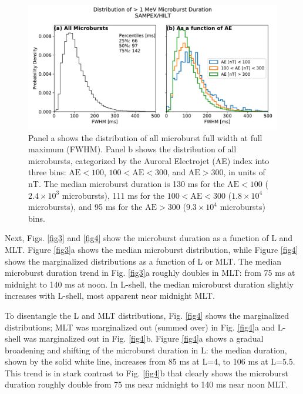 \documentclass[draft]{agujournal2019}
\begin{document}
\begin{figure}
\noindent\includegraphics[width=\textwidth]{figures/fig2.pdf}
\caption{Panel a shows the distribution of all microburst full width at full maximum (FWHM). Panel b shows the distribution of all microbursts, categorized by the Auroral Electrojet (AE) index into three bins: $\mathrm{AE} < 100$, $100 < \mathrm{AE} < 300$, and $\mathrm{AE} > 300$, in units of nT. The median microburst duration is 130 ms for the $\mathrm{AE} < 100$ ($2.4\times 10^{3}$ microbursts), 111 ms for the $100 < \mathrm{AE} < 300$ ($1.8\times 10^{4}$ microbursts), and 95 ms for the $ \mathrm{AE} > 300$ ($9.3\times 10^{4}$ microbursts) bins.}
\label{fig2}
\end{figure}

Next, Figs. \ref{fig3} and \ref{fig4} show the microburst duration as a function of L and MLT. Figure \ref{fig3}a shows the median microburst distribution, while Figure \ref{fig4} shows the marginalized distributions as a function of L or MLT. The median microburst duration trend in Fig. \ref{fig3}a roughly doubles in MLT: from 75 ms at midnight to 140 ms at noon. In L-shell, the median microburst duration slightly increases with L-shell, most apparent near midnight MLT.

To disentangle the L and MLT distributions, Fig. \ref{fig4} shows the marginalized distributions; MLT was marginalized out (summed over) in Fig. \ref{fig4}a and L-shell was marginalized out in Fig. \ref{fig4}b. Figure \ref{fig4}a shows a gradual broadening and shifting of the microburst duration in L: the median duration, shown by the solid white line, increases from 85 ms at L=4, to 106 ms at L=5.5. This trend is in stark contrast to Fig. \ref{fig4}b that clearly shows the microburst duration roughly double from 75 ms near midnight to 140 ms near noon MLT.
\end{document}
